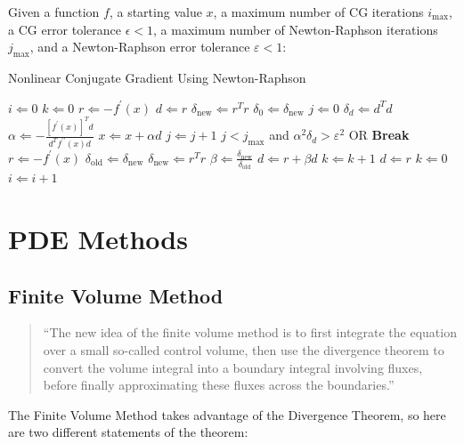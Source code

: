 \documentclass[11pt]{article}
\begin{document}
Given a function $f$, a starting value $x$, a maximum number of CG iterations $i_{\text{max}}$, a CG error tolerance $\epsilon<1$, a maximum number of Newton-Raphson iterations $j_{\text{max}}$, and a Newton-Raphson error tolerance $\varepsilon<1$:
\begin{algorithm}[H]
	\caption{Nonlinear Conjugate Gradient Using Newton-Raphson \cite{Shewchuk1994}\label{CongGradAlg}}
	\begin{algorithmic}
		\State $i\Leftarrow 0$
		\State $k\Leftarrow 0$
		\State $r\Leftarrow -f^{\prime}(x)$
		\State $d\Leftarrow r$
		\State $\delta_{\text{new}}\Leftarrow r^Tr$
		\State $\delta_0\Leftarrow\delta_{\text{new}}$
		\State $j\Leftarrow 0$
		\State $\delta_d\Leftarrow d^Td$
		\State $\alpha\Leftarrow -\frac{\left[f^{\prime}(x)\right]^Td}{d^Tf^{\prime\prime}(x)d}$
		\State $x\Leftarrow x+\alpha d$
		\State $j\Leftarrow j+1$
		\State $j<j_{\text{max}}$ and $\alpha^2\delta_d>\varepsilon^2$ OR \textbf{Break}
		\EndWhile
		\State $r\Leftarrow -f^{\prime}(x)$
		\State $\delta_{\text{old}}\Leftarrow\delta_{\text{new}}$
		\State $\delta_{\text{new}}\Leftarrow r^T r$
		\State $\beta\Leftarrow\frac{\delta_{\text{new}}}{\delta_{\text{old}}}$
		\State $d\Leftarrow r+\beta d$
		\State $k\Leftarrow k+1$
		\State $d\Leftarrow r$
		\State $k\Leftarrow 0$
		\EndIf
		\State $i\Leftarrow i+1$
		\EndWhile
	\end{algorithmic}
\end{algorithm}
\section*{PDE Methods}
\subsection*{Finite Volume Method}
\begin{quote}
	``The new idea of the {\color{tiananmen}finite volume method} is to first integrate the equation over a small so-called {\color{baystate}control volume}, then use the {\color{baystate}divergence theorem} to convert the volume integral into a {\color{baystate}boundary integral involving fluxes}, before finally approximating these fluxes across the boundaries.'' \cite{Gander2018}
\end{quote}

The Finite Volume Method takes advantage of the Divergence Theorem, so here are two different statements of the theorem:
\end{document}

